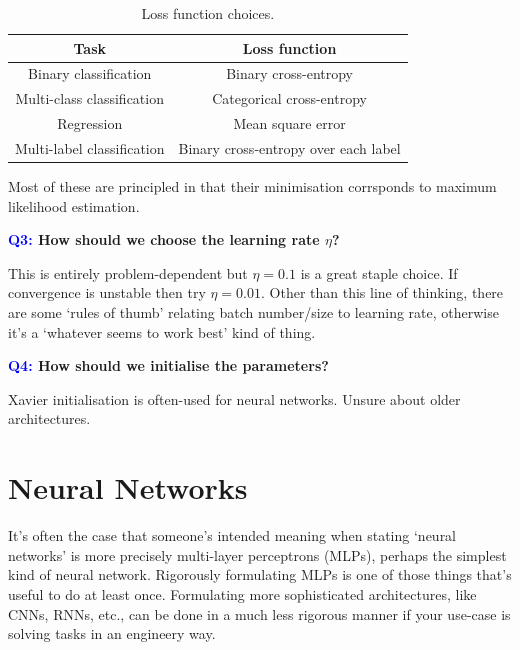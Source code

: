 \documentclass[11pt]{article}
\begin{document}
\begin{table}[ht]
    \begin{center}
        \begin{tabular}{c||c}
            \textbf{Task} & \textbf{Loss function}\\
            \hline
            \hline
            Binary classification & Binary cross-entropy\\
            Multi-class classification & Categorical cross-entropy\\
            Regression & Mean square error\\
            Multi-label classification & Binary cross-entropy over each label\\
            \hline
        \end{tabular}
    \end{center}
    \vspace{-15pt}
    \caption{\centering Loss function choices.}
    \label{tab:loss_func_choices}
\end{table}
\noindent Most of these are principled in that their minimisation corrsponds to maximum likelihood estimation.

\begin{center}
    \textbf{\textcolor{blue}{Q3:} How should we choose the learning rate $\eta$?}
\end{center}
This is entirely problem-dependent but $\eta=0.1$ is a great staple choice. If convergence is unstable then try $\eta=0.01$. Other than this line of thinking, there are some `rules of thumb' relating batch number/size to learning rate, otherwise it's a `whatever seems to work best' kind of thing.

\begin{center}
    \textbf{\textcolor{blue}{Q4:} How should we initialise the parameters?}
\end{center}
Xavier initialisation is often-used for neural networks. Unsure about older architectures.

\section{Neural Networks}
It's often the case that someone's intended meaning when stating `neural networks' is more precisely multi-layer perceptrons (MLPs), perhaps the simplest kind of neural network. Rigorously formulating MLPs is one of those things that's useful to do at least once. Formulating more sophisticated architectures, like CNNs, RNNs, etc., can be done in a much less rigorous manner if your use-case is solving tasks in an engineery way.\\
\end{document}
